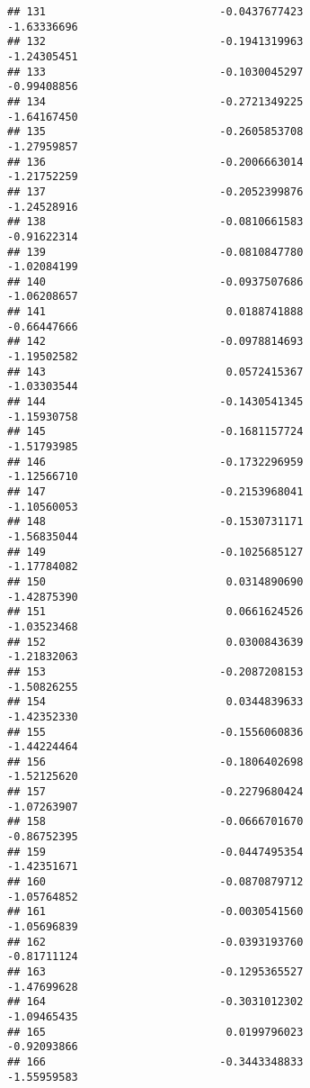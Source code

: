 \documentclass[
]{article}
\begin{document}
\begin{verbatim}
## 131                           -0.0437677423                -1.63336696
## 132                           -0.1941319963                -1.24305451
## 133                           -0.1030045297                -0.99408856
## 134                           -0.2721349225                -1.64167450
## 135                           -0.2605853708                -1.27959857
## 136                           -0.2006663014                -1.21752259
## 137                           -0.2052399876                -1.24528916
## 138                           -0.0810661583                -0.91622314
## 139                           -0.0810847780                -1.02084199
## 140                           -0.0937507686                -1.06208657
## 141                            0.0188741888                -0.66447666
## 142                           -0.0978814693                -1.19502582
## 143                            0.0572415367                -1.03303544
## 144                           -0.1430541345                -1.15930758
## 145                           -0.1681157724                -1.51793985
## 146                           -0.1732296959                -1.12566710
## 147                           -0.2153968041                -1.10560053
## 148                           -0.1530731171                -1.56835044
## 149                           -0.1025685127                -1.17784082
## 150                            0.0314890690                -1.42875390
## 151                            0.0661624526                -1.03523468
## 152                            0.0300843639                -1.21832063
## 153                           -0.2087208153                -1.50826255
## 154                            0.0344839633                -1.42352330
## 155                           -0.1556060836                -1.44224464
## 156                           -0.1806402698                -1.52125620
## 157                           -0.2279680424                -1.07263907
## 158                           -0.0666701670                -0.86752395
## 159                           -0.0447495354                -1.42351671
## 160                           -0.0870879712                -1.05764852
## 161                           -0.0030541560                -1.05696839
## 162                           -0.0393193760                -0.81711124
## 163                           -0.1295365527                -1.47699628
## 164                           -0.3031012302                -1.09465435
## 165                            0.0199796023                -0.92093866
## 166                           -0.3443348833                -1.55959583

\end{verbatim}
\end{document}
